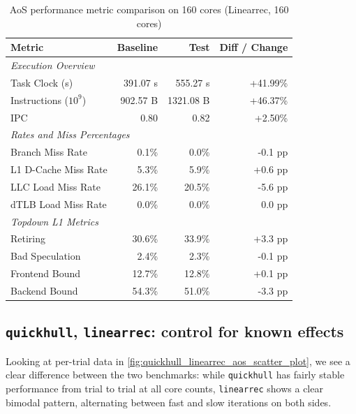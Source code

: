     \begin{table}[htbp]
      \centering
      \caption{AoS performance metric comparison on 160 cores (Linearrec, 160 cores)}
      \label{tab:perf_comparison_aos_linearrec_160cores}
      \begin{tabular}{lrrr}
        \toprule
        \textbf{Metric} & \textbf{Baseline} & \textbf{Test} & \textbf{Diff / Change} \\
        \midrule
        \multicolumn{4}{l}{\textit{Execution Overview}} \\
        \quad Task Clock (s)           & 391.07 s   & 555.27 s   & +41.99\%   \\
        \quad Instructions ($10^9$)    & 902.57 B  & 1321.08 B  & +46.37\%   \\
        \quad IPC                      & 0.80       & 0.82       & +2.50\%    \\
        \midrule
        \multicolumn{4}{l}{\textit{Rates and Miss Percentages}} \\
        \quad Branch Miss Rate         & 0.1\%      & 0.0\%      & -0.1 pp    \\
        \quad L1 D-Cache Miss Rate     & 5.3\%      & 5.9\%      & +0.6 pp    \\
        \quad LLC Load Miss Rate       & 26.1\%     & 20.5\%     & -5.6 pp    \\
        \quad dTLB Load Miss Rate      & 0.0\%      & 0.0\%      & 0.0 pp     \\
        \midrule
        \multicolumn{4}{l}{\textit{Topdown L1 Metrics}} \\
        \quad Retiring                 & 30.6\%     & 33.9\%     & +3.3 pp   \\
        \quad Bad Speculation          & 2.4\%     & 2.3\%     & -0.1 pp   \\
        \quad Frontend Bound           & 12.7\%     & 12.8\%     & +0.1 pp   \\
        \quad Backend Bound            & 54.3\%     & 51.0\%     & -3.3 pp   \\
        \bottomrule
      \end{tabular}
    \end{table}

\subsection{\texttt{quickhull}, \texttt{linearrec}: control for known effects}
Looking at per-trial data in \cref{fig:quickhull_linearrec_aos_scatter_plot}, we
see a clear difference between the two benchmarks: while \texttt{quickhull} has
fairly stable performance from trial to trial at all core counts,
\texttt{linearrec} shows a clear bimodal pattern, alternating between fast and
slow iterations on both sides.

